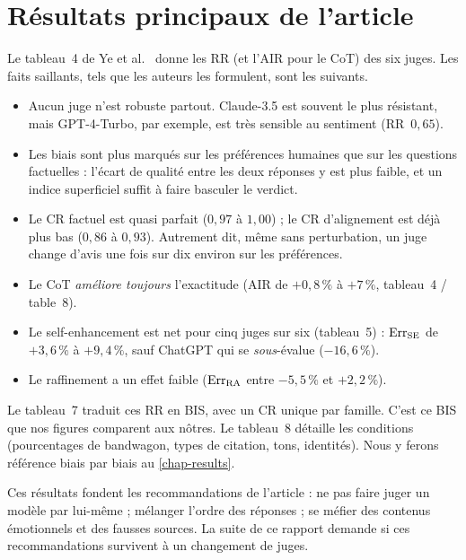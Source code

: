 \section{Résultats principaux de l'article}

Le tableau~4 de Ye et al.\ \cite{ye2025justice} donne les RR (et l'AIR pour le CoT) des six juges. Les faits saillants, tels que les auteurs les formulent, sont les suivants.

\begin{itemize}[leftmargin=1.6em]
  \item Aucun juge n'est robuste partout. Claude-3.5 est souvent le plus résistant, mais GPT-4-Turbo, par exemple, est très sensible au sentiment (RR~$0{,}65$).
  \item Les biais sont plus marqués sur les préférences humaines que sur les questions factuelles : l'écart de qualité entre les deux réponses y est plus faible, et un indice superficiel suffit à faire basculer le verdict.
  \item Le CR factuel est quasi parfait ($0{,}97$ à $1{,}00$) ; le CR d'alignement est déjà plus bas ($0{,}86$ à $0{,}93$). Autrement dit, même sans perturbation, un juge change d'avis une fois sur dix environ sur les préférences.
  \item Le CoT \emph{améliore toujours} l'exactitude (AIR de $+0{,}8\,\%$ à $+7\,\%$, tableau~4 / table~8).
  \item Le self-enhancement est net pour cinq juges sur six (tableau~5) : $\mathrm{Err}_{\mathrm{SE}}$ de $+3{,}6\,\%$ à $+9{,}4\,\%$, sauf ChatGPT qui se \emph{sous}-évalue ($-16{,}6\,\%$).
  \item Le raffinement a un effet faible ($\mathrm{Err}_{\mathrm{RA}}$ entre $-5{,}5\,\%$ et $+2{,}2\,\%$).
\end{itemize}

Le tableau~7 traduit ces RR en BIS, avec un CR unique par famille. C'est ce BIS que nos figures comparent aux nôtres. Le tableau~8 détaille les conditions (pourcentages de bandwagon, types de citation, tons, identités). Nous y ferons référence biais par biais au \cref{chap-results}.

Ces résultats fondent les recommandations de l'article : ne pas faire juger un modèle par lui-même ; mélanger l'ordre des réponses ; se méfier des contenus émotionnels et des fausses sources. La suite de ce rapport demande si ces recommandations survivent à un changement de juges.
